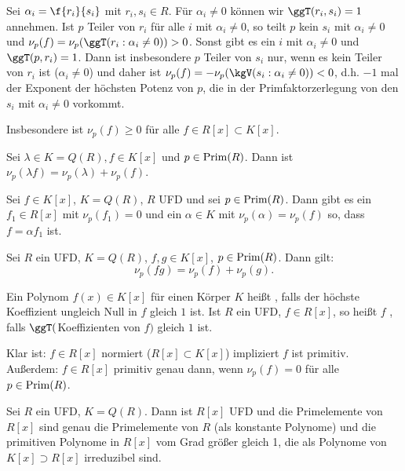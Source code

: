 \begin{nt} \label{15.3-3}
	Sei $\alpha_i = \f {r_i}{s_i}$ mit $r_i, s_i \in R$.
	Für $\alpha_i \neq 0$ können wir $\ggT(r_i, s_i) = 1$ annehmen.
	Ist $p$ Teiler von $r_i$ für alle $i$ mit $\alpha_i \neq 0$, so teilt $p$ kein $s_i$ mit $\alpha_i \neq 0$ und $\nu_p(f) = \nu_p(\ggT(r_i : \alpha_i \neq 0)) > 0$.
	Sonst gibt es ein $i$ mit $\alpha_i \neq 0$ und $\ggT(p, r_i) = 1$.
	Dann ist insbesondere $p$ Teiler von $s_i$ nur, wenn es kein Teiler von $r_i$ ist ($\alpha_i \neq 0$) und daher ist $\nu_p(f) = -\nu_p(\kgV(s_i : \alpha_i \neq 0)) < 0$, d.h. $-1$ mal der Exponent der höchsten Potenz von $p$, die in der Primfaktorzerlegung von den $s_i$ mit $\alpha_i \neq 0$ vorkommt.

	Insbesondere ist $\nu_p(f) \ge 0$ für alle $f \in R[x] \subset K[x]$.
\end{nt}

\begin{lem} \label{15.3-4}
	Sei $\lambda \in K = Q(R), f \in K[x]$ und $p \in \operatorname{Prim}(R)$.
	Dann ist $\nu_p(\lambda f) = \nu_p(\lambda) + \nu_p(f)$.
\end{lem}

\begin{kor} \label{15.3-5}
	Sei $f \in K[x]$, $K = Q(R)$, $R$ UFD und sei $p \in \operatorname{Prim}(R)$.
	Dann gibt es ein $f_1 \in R[x]$ mit $\nu_p(f_1) = 0$ und ein $\alpha \in K$ mit $\nu_p(\alpha) = \nu_p(f)$ so, dass $f = \alpha f_1$ ist.
\end{kor}

\begin{lem} \label{15.3-6}
	Sei $R$ ein UFD, $K = Q(R)$, $f,g \in K[x]$, $p\in \operatorname{Prim}(R)$.
	Dann gilt:
	\[
		\nu_p(fg) = \nu_p(f) + \nu_p(g).
	\]
\end{lem}

\begin{df} \label{15.3-7}
	Ein Polynom $f(x) \in K[x]$ für einen Körper $K$ heißt , falls der höchste Koeffizient ungleich Null in $f$ gleich $1$ ist.
	Ist $R$ ein UFD, $f \in R[x]$, so heißt $f$ , falls $\ggT($Koeffizienten von $f)$ gleich $1$ ist.

	Klar ist: $f \in R[x]$ normiert ($R[x] \subset K[x]$) impliziert $f$ ist primitiv.
	Außerdem: $f \in R[x]$ primitiv genau dann, wenn $\nu_p(f) = 0$ für alle $p \in \operatorname{Prim}(R)$.
\end{df}

\begin{st} \label{15.3-8}
	Sei $R$ ein UFD, $K = Q(R)$.
	Dann ist $R[x]$ UFD und die Primelemente von $R[x]$ sind genau die Primelemente von $R$ (als konstante Polynome) und die primitiven Polynome in $R[x]$ vom Grad größer gleich 1, die als Polynome von $K[x] \supset R[x]$ irreduzibel sind.
\end{st}

